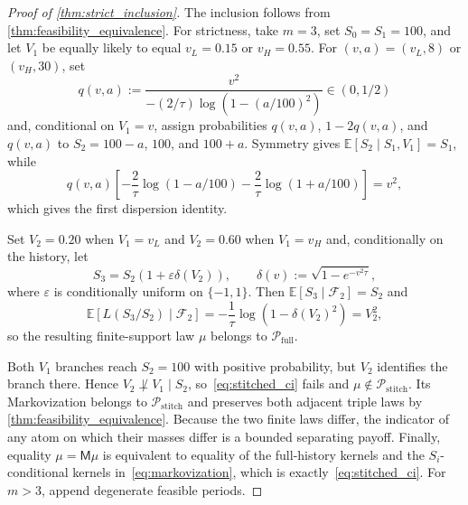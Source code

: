 \documentclass[10pt,a4paper]{amsart}
\newcommand{\Embb}{\mathbb{E}}
\newcommand{\cF}{\mathcal{F}}
\newcommand{\cP}{\mathcal{P}}
\begin{document}
\begin{proof}[Proof of \cref{thm:strict_inclusion}]
The inclusion follows from \cref{thm:feasibility_equivalence}.
For strictness, take $m=3$, set $S_0=S_1=100$, and let $V_1$ be equally likely to equal $v_L=0.15$ or $v_H=0.55$.
For $(v,a)=(v_L,8)$ or $(v_H,30)$, set
\[
q(v,a):=\frac{v^2}{-(2/\tau)\log(1-(a/100)^2)}\in(0,1/2)
\]
and, conditional on $V_1=v$, assign probabilities $q(v,a)$, $1-2q(v,a)$, and $q(v,a)$ to $S_2=100-a$, $100$, and $100+a$.
Symmetry gives $\Embb[S_2\mid S_1,V_1]=S_1$, while
\[
q(v,a)\left[-\frac{2}{\tau}\log(1-a/100)-\frac{2}{\tau}\log(1+a/100)\right]=v^2,
\]
which gives the first dispersion identity.

Set $V_2=0.20$ when $V_1=v_L$ and $V_2=0.60$ when $V_1=v_H$ and, conditionally on the history, let
\[
S_3=S_2(1+\varepsilon\delta(V_2)),
\qquad
\delta(v):=\sqrt{1-e^{-v^2\tau}},
\]
where $\varepsilon$ is conditionally uniform on $\{-1,1\}$.
Then $\Embb[S_3\mid\cF_2]=S_2$ and
\[
\Embb[L(S_3/S_2)\mid\cF_2]
=-\frac{1}{\tau}\log(1-\delta(V_2)^2)=V_2^2,
\]
so the resulting finite-support law $\mu$ belongs to $\cP_{\mathrm{full}}$.

Both $V_1$ branches reach $S_2=100$ with positive probability, but $V_2$ identifies the branch there.
Hence $V_2\not\perp V_1\mid S_2$, so~\eqref{eq:stitched_ci} fails and $\mu\notin\cP_{\mathrm{stitch}}$.
Its Markovization belongs to $\cP_{\mathrm{stitch}}$ and preserves both adjacent triple laws by \cref{thm:feasibility_equivalence}.
Because the two finite laws differ, the indicator of any atom on which their masses differ is a bounded separating payoff.
Finally, equality $\mu=\mathsf M\mu$ is equivalent to equality of the full-history kernels and the $S_i$-conditional kernels in~\eqref{eq:markovization}, which is exactly~\eqref{eq:stitched_ci}.
For $m>3$, append degenerate feasible periods.
\end{proof}
\end{document}
